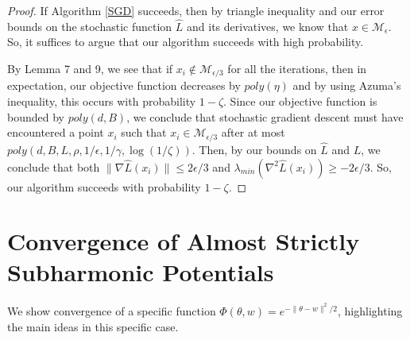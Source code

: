 \documentclass[11pt]{article}
\begin{document}
\begin{proof}
If Algorithm \ref{SGD} succeeds, then by triangle inequality and our error bounds on the stochastic function $\widehat{L}$ and its derivatives, we know that $x \in \mathcal{M}_\epsilon$. So, it suffices to argue that our algorithm succeeds with high probability.

By \cite{GeHJY15} Lemma 7 and 9, we see that if $x_i \not \in\mathcal{M}_{\epsilon/3}$ for all the iterations, then in expectation, our objective function decreases by $poly(\eta)$ and by using Azuma's inequality, this occurs with probability $1-\zeta$. Since our objective function is bounded by $poly(d,B)$, we conclude that stochastic gradient descent must have encountered a point $x_i$ such that $x_i \in \mathcal{M}_{\epsilon/3}$ after at most $poly(d,B,L,\rho,1/\epsilon,1/\gamma, \log(1/\zeta))$. Then, by our bounds on $\widehat{L}$ and $L$, we conclude that both $\|\nabla\widehat{L}(x_i)\| \leq 2\epsilon/3$ and $\lambda_{min}(\nabla^2 \widehat{L}(x_i)) \geq -2\epsilon/3$. So, our algorithm succeeds with probability $1-\zeta$.

\end{proof}



\section{Convergence of Almost Strictly Subharmonic Potentials}\label{App:Subharm}




We show convergence of a specific function $\Phi(\theta, w) = e^{-\|\theta - w\|^2/2}$, highlighting the main ideas in this specific case.

\gaussStrict*
\end{document}
